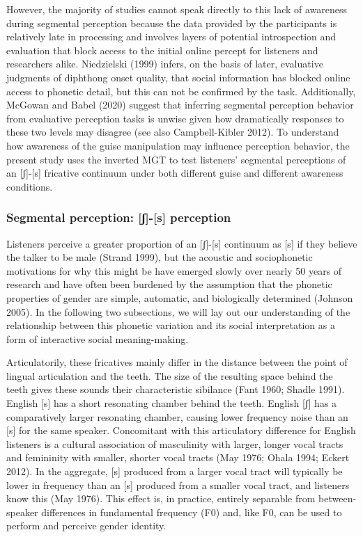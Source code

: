 \documentclass[
  letterpaper,
  DIV=11,
  numbers=noendperiod]{scrartcl}
\begin{document}
However, the majority of studies cannot speak directly to this lack of
awareness during segmental perception because the data provided by the
participants is relatively late in processing and involves layers of
potential introspection and evaluation that block access to the initial
online percept for listeners and researchers alike. Niedzielski (1999)
infers, on the basis of later, evaluative judgments of diphthong onset
quality, that social information has blocked online access to phonetic
detail, but this can not be confirmed by the task. Additionally, McGowan
and Babel (2020) suggest that inferring segmental perception behavior
from evaluative perception tasks is unwise given how dramatically
responses to these two levels may disagree (see also Campbell-Kibler
2012). To understand how awareness of the guise manipulation may
influence perception behavior, the present study uses the inverted MGT
to test listeners' segmental perceptions of an {[}ʃ{]}-{[}s{]} fricative
continuum under both different guise and different awareness conditions.

\subsubsection{Segmental perception: {[}ʃ{]}-{[}s{]}
perception}\label{sec-fricative-gender}

Listeners perceive a greater proportion of an {[}ʃ{]}-{[}s{]} continuum
as {[}s{]} if they believe the talker to be male (Strand 1999), but the
acoustic and sociophonetic motivations for why this might be have
emerged slowly over nearly 50 years of research and have often been
burdened by the assumption that the phonetic properties of gender are
simple, automatic, and biologically determined (Johnson 2005). In the
following two subsections, we will lay out our understanding of the
relationship between this phonetic variation and its social
interpretation as a form of interactive social meaning-making.

Articulatorily, these fricatives mainly differ in the distance between
the point of lingual articulation and the teeth. The size of the
resulting space behind the teeth gives these sounds their characteristic
sibilance (Fant 1960; Shadle 1991). English {[}s{]} has a short
resonating chamber behind the teeth. English {[}ʃ{]} has a comparatively
larger resonating chamber, causing lower frequency noise than an {[}s{]}
for the same speaker. Concomitant with this articulatory difference for
English listeners is a cultural association of masculinity with larger,
longer vocal tracts and femininity with smaller, shorter vocal tracts
(May 1976; Ohala 1994; Eckert 2012). In the aggregate, {[}s{]} produced
from a larger vocal tract will typically be lower in frequency than an
{[}s{]} produced from a smaller vocal tract, and listeners know this
(May 1976). This effect is, in practice, entirely separable from
between-speaker differences in fundamental frequency (F0) and, like F0,
can be used to perform and perceive gender identity.
\end{document}
